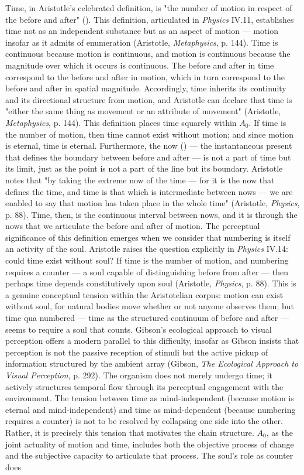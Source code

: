 Time, in Aristotle's celebrated definition, is "the number of motion in respect of the before and after" (). This definition, articulated in \textit{Physics} IV.11, establishes time not as an independent substance but as an aspect of motion --- motion insofar as it admits of enumeration (Aristotle, \textit{Metaphysics}, p. 144). Time is continuous because motion is continuous, and motion is continuous because the magnitude over which it occurs is continuous. The before and after in time correspond to the before and after in motion, which in turn correspond to the before and after in spatial magnitude. Accordingly, time inherits its continuity and its directional structure from motion, and Aristotle can declare that time is "either the same thing as movement or an attribute of movement" (Aristotle, \textit{Metaphysics}, p. 144). This definition places time squarely within $A_0$. If time is the number of motion, then time cannot exist without motion; and since motion is eternal, time is eternal. Furthermore, the now () --- the instantaneous present that defines the boundary between before and after --- is not a part of time but its limit, just as the point is not a part of the line but its boundary. Aristotle notes that "by taking the extreme now of the time --- for it is the now that defines the time, and time is that which is intermediate between nows --- we are enabled to say that motion has taken place in the whole time" (Aristotle, \textit{Physics}, p. 88). Time, then, is the continuous interval between nows, and it is through the nows that we articulate the before and after of motion. The perceptual significance of this definition emerges when we consider that numbering is itself an activity of the soul. Aristotle raises the question explicitly in \textit{Physics} IV.14: could time exist without soul? If time is the number of motion, and numbering requires a counter --- a soul capable of distinguishing before from after --- then perhaps time depends constitutively upon soul (Aristotle, \textit{Physics}, p. 88). This is a genuine conceptual tension within the Aristotelian corpus: motion can exist without soul, for natural bodies move whether or not anyone observes them; but time qua numbered --- time as the structured continuum of before and after --- seems to require a soul that counts. Gibson's ecological approach to visual perception offers a modern parallel to this difficulty, insofar as Gibson insists that perception is not the passive reception of stimuli but the active pickup of information structured by the ambient array (Gibson, \textit{The Ecological Approach to Visual Perception}, p. 292). The organism does not merely undergo time; it actively structures temporal flow through its perceptual engagement with the environment. The tension between time as mind-independent (because motion is eternal and mind-independent) and time as mind-dependent (because numbering requires a counter) is not to be resolved by collapsing one side into the other. Rather, it is precisely this tension that motivates the chain structure. $A_0$, as the joint actuality of motion and time, includes both the objective process of change and the subjective capacity to articulate that process. The soul's role as counter does 